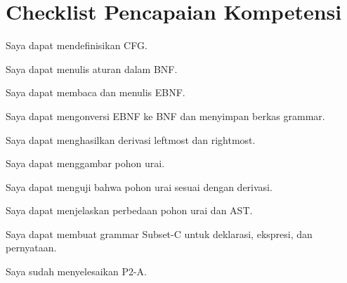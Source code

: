 \section*{Checklist Pencapaian Kompetensi}

\begin{checklist}
  \item Saya dapat mendefinisikan CFG.
  \item Saya dapat menulis aturan dalam BNF.
  \item Saya dapat membaca dan menulis EBNF.
  \item Saya dapat mengonversi EBNF ke BNF dan menyimpan berkas
        grammar.
  \item Saya dapat menghasilkan derivasi leftmost dan rightmost.
  \item Saya dapat menggambar pohon urai.
  \item Saya dapat menguji bahwa pohon urai sesuai dengan derivasi.
  \item Saya dapat menjelaskan perbedaan pohon urai dan AST.
  \item Saya dapat membuat grammar Subset-C untuk deklarasi,
        ekspresi, dan pernyataan.
  \item Saya sudah menyelesaikan P2-A.
\end{checklist}

